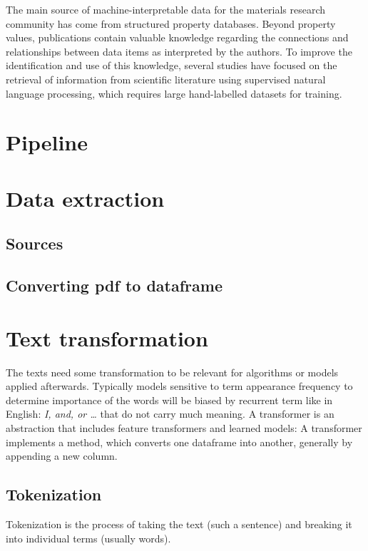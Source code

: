 
The main source of machine-interpretable data for the materials research community has come from structured property databases. Beyond property values, publications contain valuable knowledge regarding the connections and relationships between data items as interpreted by the authors. To improve the identification and use of this knowledge, several studies have focused on the retrieval of information from scientific literature using supervised natural language processing, which requires large hand-labelled datasets for training.

\section{Pipeline}
 
\section{Data extraction}

\subsection{Sources}
\subsection{Converting pdf to dataframe}

\section{Text transformation}
The texts need some transformation to be relevant for algorithms or models applied afterwards. Typically models sensitive to term appearance frequency to determine importance of the words will be biased by recurrent term like in English: \textit{I, and, or \ldots} that do not carry much meaning.
\newline
A transformer is an abstraction that includes feature transformers and learned models: \ie A transformer implements a method, which converts one dataframe into another, generally by appending a new column.  

\subsection{Tokenization}
Tokenization is the process of taking the text (such a sentence) and breaking it into individual terms (usually words).

